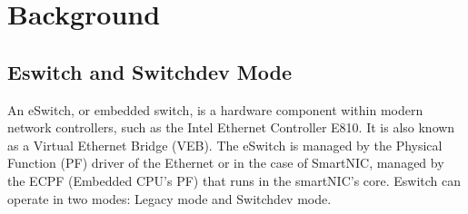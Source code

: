 \documentclass[letterpaper]{article}
\begin{document}

\section{Background}
\subsection{Eswitch and Switchdev Mode}
An eSwitch, or embedded switch, is a hardware component within modern network
controllers, such as the Intel Ethernet Controller E810. It is also known as
a Virtual Ethernet Bridge (VEB). The eSwitch is managed by the Physical Function (PF)
driver of the Ethernet or in the case of SmartNIC, managed by the ECPF (Embedded
CPU's PF) that runs in the smartNIC's core. Eswitch can operate in two modes:
Legacy mode and Switchdev mode.
\end{document}
